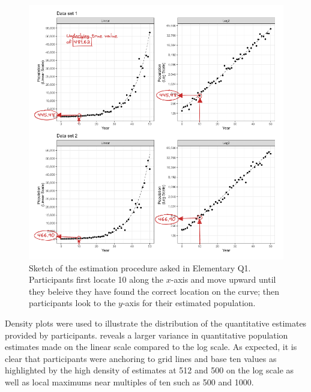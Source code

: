 \documentclass[print]{nuthesis}
\begin{document}
\begin{figure}[tbp]

{\centering \includegraphics[width=1\linewidth,]{images/03-estimation/qe1-sketch} 

}

\caption[Elementary Q1 sketch]{Sketch of the estimation procedure asked in Elementary Q1. Participants first locate 10 along the $x$-axis and move upward until they beleive they have found the correct location on the curve; then participants look to the $y$-axis for their estimated population.}\label{fig:qe1-sketch}
\end{figure}

Density plots were used to illustrate the distribution of the quantitative estimates provided by participants.
 reveals a larger variance in quantitative population estimates made on the linear scale compared to the log scale.
As expected, it is clear that participants were anchoring to grid lines and base ten values as highlighted by the high density of estimates at 512 and 500 on the log scale as well as local maximums near multiples of ten such as 500 and 1000.
\end{document}

